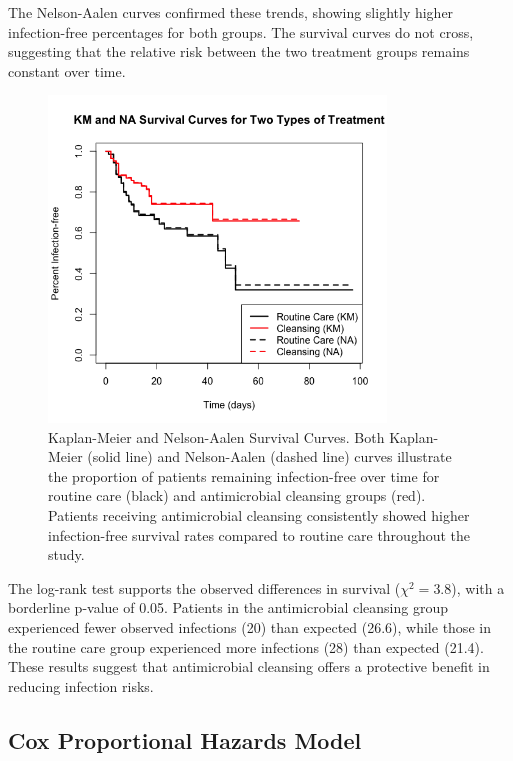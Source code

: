 \documentclass[12pt]{article}
\begin{document}
The Nelson-Aalen curves confirmed these trends, showing slightly higher infection-free percentages for both groups. The survival curves do not cross, suggesting that the relative risk between the two treatment groups remains constant over time.

\begin{figure}[H]
    \centering
    \includegraphics[width=0.8\textwidth]{plots/km_na_curve.png}
    \caption{Kaplan-Meier and Nelson-Aalen Survival Curves. 
    Both Kaplan-Meier (solid line) and Nelson-Aalen (dashed line) curves illustrate the proportion of patients remaining infection-free over time for routine care (black) and antimicrobial cleansing groups (red). Patients receiving antimicrobial cleansing consistently showed higher infection-free survival rates compared to routine care throughout the study.}
    \label{fig:km_na_curves}
\end{figure}

The log-rank test supports the observed differences in survival (\( \chi^2 = 3.8 \)), with a borderline p-value of 0.05. Patients in the antimicrobial cleansing group experienced fewer observed infections (20) than expected (26.6), while those in the routine care group experienced more infections (28) than expected (21.4). These results suggest that antimicrobial cleansing offers a protective benefit in reducing infection risks.


\subsection*{Cox Proportional Hazards Model}
\end{document}
